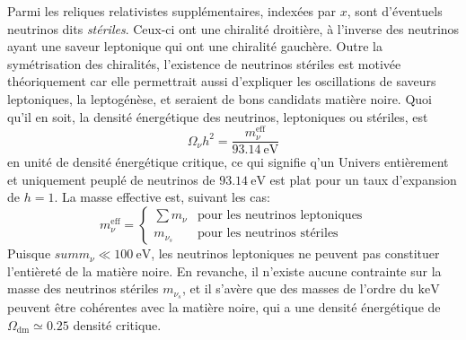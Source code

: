Parmi les reliques relativistes supplémentaires, indexées par $x$, sont d'éventuels neutrinos dits \emph{stériles}. Ceux-ci ont une chiralité droitière, à l'inverse des neutrinos ayant une saveur leptonique qui ont une chiralité gauchère. Outre la symétrisation des chiralités, l'existence de neutrinos stériles est motivée théoriquement car elle permettrait aussi d'expliquer les oscillations de saveurs leptoniques, la leptogénèse, et seraient de bons candidats matière noire. Quoi qu'il en soit, la densité énergétique des neutrinos, leptoniques ou stériles, est
\begin{equation}
\label{eq:omnu}
\Omega_\nu h^2 = \frac{m_\nu^\mathrm{eff}}{93.14~\mathrm{eV}}
\end{equation} en unité de densité énergétique critique, ce qui signifie q'un Univers entièrement et uniquement peuplé de neutrinos de $93.14~\mathrm{eV}$ est plat pour un taux d'expansion de $h=1$. La masse effective est, suivant les cas: \\
\begin{equation}
m_\nu^\mathrm{eff} = 
\left\{
\begin{array}{ll}
\sum m_\nu & \text{pour les neutrinos leptoniques} \\
m_{\nu_s} & \text{pour les neutrinos stériles}
\end{array}
\right.
\end{equation} Puisque $sum m_\nu \ll 100~\mathrm{eV}$, les neutrinos leptoniques ne peuvent pas constituer l'entièreté de la matière noire. En revanche, il n'existe aucune contrainte sur la masse des neutrinos stériles $m_{\nu_s}$, et il s'avère que des masses de l'ordre du $\mathrm{keV}$ peuvent être cohérentes avec la matière noire, qui a une densité énergétique de $\Omega_{\mathrm{dm}} \simeq 0.25$ densité critique. \\

